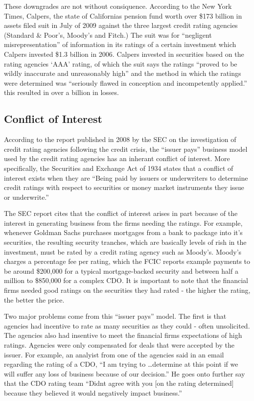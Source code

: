 \documentclass[11pt]{article}
\begin{document}
\begin{multicols}{2}
These downgrades are not without consiquence.  According to the New York Times, Calpers, the state of Californias pension fund worth over \$173 billion in assets filed suit in July of 2009 against the three largest credit rating agencies (Standard \& Poor's, Moody's and Fitch.) The suit was for ``negligent misrepresentation'' of information in its ratings of a certain investment which Calpers invested \$1.3 billion in 2006.  Calpers invested in securities based on the rating agencies `AAA' rating, of which the suit says the ratings ``proved to be wildly inaccurate and unreasonably high'' and the method in which the ratings were determined was ``seriously flawed in conception and incompetently applied.''  this resulted in over a billion in losses. \cite{nyTimesCalpers} 

\subsection{Conflict of Interest}
According to the report published in 2008 by the SEC on the investigation of credit rating agencies following the credit crisis, the ``issuer pays'' business model used by the credit rating agencies has an inherant conflict of interest. \cite[p. 23]{secCRAreport}  More specifically, the Securities and Exchange Act of 1934 states that a conflict of interest exists when they are ``Being paid by issuers or underwriters to determine credit ratings with respect to securities or money market instruments they issue or underwrite.'' \cite[Rule 17g-5(b)(1)]{SEA} 

The SEC report cites that the conflict of interest arises in part because of the interest in generating business from the firms needing the ratings.  For example, whenever Goldman Sachs purchases mortgages from a bank to package into it's securities, the resulting security tranches, which are basically levels of rish in the investment, must be rated by a credit rating agency such as Moody's.  Moody's charges a percentage fee per rating, which the FCIC reports example payments to be around \$200,000 for a typical mortgage-backed security and between half a million to \$850,000 for a complex CDO.\cite[p. 146]{govtReport} It is important to note that the financial firms needed good ratings on the securities they had rated - the higher the rating, the better the price.  

Two major problems come from this ``issuer pays'' model.  The first is that agencies had incentive to rate as many securities as they could - often unsolicited. \cite[p.60]{gatekeepers} The agencies also had insentive to meet the financial firms expectations of high ratings.  Agencies were only compensated for deals that were accepted by the issuer. \cite[p. 210]{govtReport} For example, an analyist from one of the agencies said in an email regarding the rating of a CDO, ``I am trying to \ldots determine at this point if we will suffer any loss of business because of our decision.'' He goes onto further say that the CDO rating team ``Didnt agree with you [on the rating determined] because they believed it would negatively impact business.'' \cite[p. 26]{SEA} 


\end{multicols}
\end{document}

